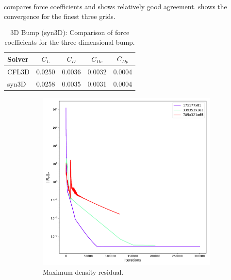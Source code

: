  compares force coefficients and shows relatively good agreement.  shows the convergence for the finest three grids.
\begin{table}[ht!]
\centering
\caption{3D Bump (syn3D): Comparison of force coefficients for the three-dimensional bump.}
\label{tab:syn3dbump}
\begin{tabular}{@{}l cccc@{}}
\toprule
Solver & $C_L$ & $C_D$ & $C_{Dv}$ & $C_{Dp}$ \\  \midrule
CFL3D & 0.0250 & 0.0036  & 0.0032 & 0.0004  \\
syn3D &  0.0258 & 0.0035  & 0.0031 & 0.0004  \\
\bottomrule
\end{tabular}
\end{table}
 \begin{figure}[ht!]
\centering
\begin{subfigure}{.45\textwidth}
  \centering
  \includegraphics[width=1.0\textwidth]{figs/3dbump/convergenceRho.pdf}
  \caption{Maximum density residual.}
\end{subfigure}%
\begin{subfigure}{.45\textwidth}
  \centering

\end{subfigure}
\end{figure}
